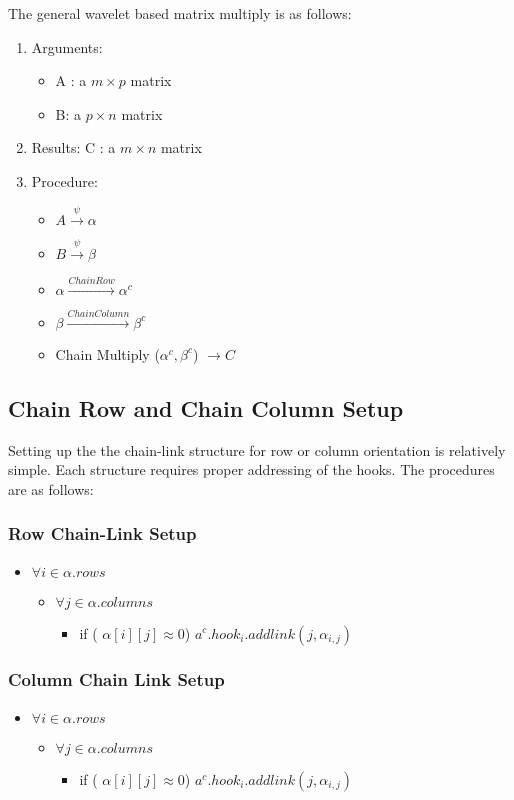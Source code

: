 The general wavelet based matrix multiply is as follows:
\begin{enumerate}\item Arguments:  
\begin{itemize}\item A :  a $m \times p$ matrix
\item B: a $p \times n$ matrix\end{itemize}
\item Results:  C : a $m \times n$ matrix
\item Procedure:
\begin{itemize}\item $ A \stackrel{\psi}{\to} \alpha$
\item $ B \stackrel{\psi}{\to} \beta$
\item $ \alpha \stackrel {Chain Row}{\to} \alpha ^c$
\item $ \beta \stackrel {Chain Column}{\to} \beta ^c$
\item Chain Multiply ($\alpha ^c , \beta ^c$) $\to C$ \end{itemize}\end{enumerate}\subsection{Chain Row and Chain Column Setup}Setting up the the chain-link structure for row or column orientation is relatively simple.  Each structure requires proper addressing of the hooks.  The procedures are as follows:

\subsubsection{Row Chain-Link Setup}
\begin{itemize}\item $\forall i  \in \alpha .rows$
\begin{itemize}\item $\forall j \in \alpha . columns$
\begin{itemize}\item if ( $\alpha [i][j] \approx 0 $)
$a^c.hook_i . addlink(j,\alpha_{i,j} ) $\end{itemize}\end{itemize}\end{itemize}
\subsubsection{Column Chain Link Setup}
\begin{itemize}\item $\forall i  \in \alpha .rows$
\begin{itemize}\item $\forall j \in \alpha . columns$
\begin{itemize}\item if ( $\alpha [i][j] \approx 0 $)
$a^c.hook_i . addlink(j,\alpha_{i,j} ) $\end{itemize}\end{itemize}\end{itemize}

